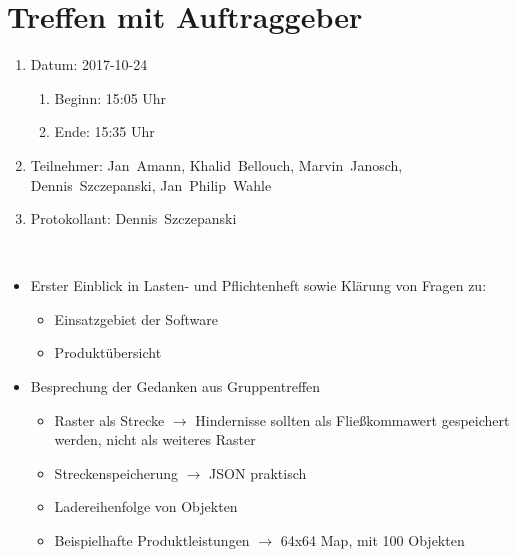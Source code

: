 \pagebreak
\section[Treffen mit Auftraggeber - 2017-10-24]{Treffen mit Auftraggeber}

\begin{enumerate}
	\item Datum: 2017-10-24
	\begin{enumerate}[label*=\arabic*.]
		\item Beginn: 15:05 Uhr
		\item Ende: 15:35 Uhr
	\end{enumerate}
	
	\item Teilnehmer:
	\subitem Jan~Amann, Khalid~Bellouch, Marvin~Janosch, Dennis~Szczepanski, Jan~Philip~Wahle
	
	\item Protokollant: Dennis~Szczepanski
\end{enumerate}
\ \\

\begin{itemize}
	\item Erster Einblick in Lasten- und Pflichtenheft sowie Klärung von Fragen zu:
	\begin{itemize}
		\item Einsatzgebiet der Software
		\item Produktübersicht
	\end{itemize}
	
	\item Besprechung der Gedanken aus Gruppentreffen
	\begin{itemize}
		\item Raster als Strecke $\rightarrow$ Hindernisse sollten als Fließkommawert gespeichert werden, nicht als weiteres Raster
		\item Streckenspeicherung $\rightarrow$ JSON praktisch
		\item Ladereihenfolge von Objekten
		\item Beispielhafte Produktleistungen $\rightarrow$ 64x64 Map, mit 100 Objekten
	\end{itemize}
\end{itemize}